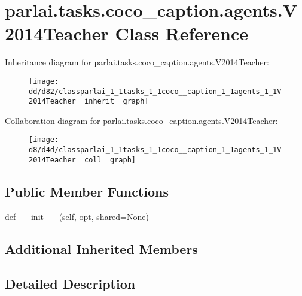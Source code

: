 \hypertarget{classparlai_1_1tasks_1_1coco__caption_1_1agents_1_1V2014Teacher}{}\section{parlai.\+tasks.\+coco\+\_\+caption.\+agents.\+V2014\+Teacher Class Reference}
\label{classparlai_1_1tasks_1_1coco__caption_1_1agents_1_1V2014Teacher}


Inheritance diagram for parlai.\+tasks.\+coco\+\_\+caption.\+agents.\+V2014\+Teacher\+:\nopagebreak
\begin{figure}[H]
\begin{center}
\leavevmode
\texttt{[image: dd/d82/classparlai\_1\_1tasks\_1\_1coco\_\_caption\_1\_1agents\_1\_1V2014Teacher\_\_inherit\_\_graph]}
\end{center}
\end{figure}


Collaboration diagram for parlai.\+tasks.\+coco\+\_\+caption.\+agents.\+V2014\+Teacher\+:\nopagebreak
\begin{figure}[H]
\begin{center}
\leavevmode
\texttt{[image: d8/d4d/classparlai\_1\_1tasks\_1\_1coco\_\_caption\_1\_1agents\_1\_1V2014Teacher\_\_coll\_\_graph]}
\end{center}
\end{figure}
\subsection*{Public Member Functions}
\begin{DoxyCompactItemize}
\item 
def \hyperlink{classparlai_1_1tasks_1_1coco__caption_1_1agents_1_1V2014Teacher_a270de04c549341bc63faf54b5f448108}{\+\_\+\+\_\+init\+\_\+\+\_\+} (self, \hyperlink{classparlai_1_1core_1_1agents_1_1Teacher_a3ce6243860ce978a897922863ed32fa4}{opt}, shared=None)
\end{DoxyCompactItemize}
\subsection*{Additional Inherited Members}


\subsection{Detailed Description}


